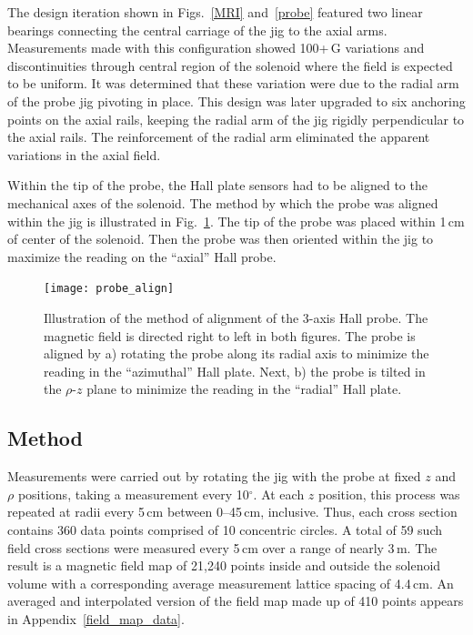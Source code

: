 The design iteration shown in Figs.~\ref{MRI} and~\ref{probe} featured two linear bearings connecting the central carriage of the jig to the axial arms.  Measurements made with this configuration showed 100+\,G variations and discontinuities through central region of the solenoid where the field is expected to be uniform.  It was determined that these variation were due to the radial arm of the probe jig pivoting in place.  This design was later upgraded to six anchoring points on the axial rails, keeping the radial arm of the jig rigidly perpendicular to the axial rails.  The reinforcement of the radial arm eliminated the apparent variations in the axial field.

Within the tip of the probe, the Hall plate sensors had to be aligned to the mechanical axes of the solenoid. The method by which the probe was aligned within the jig is illustrated in Fig.~\ref{probe_align}.  The tip of the probe was placed within 1\,cm of center of the solenoid.  Then the probe was then oriented within the jig to maximize the reading on the ``axial'' Hall probe.

\begin{figure}%
\centering
\texttt{[image: probe\_align]}%
\caption[Illustration of the method of alignment of the 3-axis Hall probe]{Illustration of the method of alignment of the 3-axis Hall probe.  The magnetic field is directed right to left in both figures.  The probe is aligned by a) rotating the probe along its radial axis to minimize the reading in the ``azimuthal'' Hall plate.  Next, b) the probe is tilted in the $\rho$-$z$ plane to minimize the reading in the ``radial'' Hall plate.}%
\label{probe_align}%
\end{figure}

\subsection{Method}
Measurements were carried out by rotating the jig with the probe at fixed $z$ and $\rho$ positions, taking a measurement every 10$^\circ$.  At each $z$ position, this process was repeated at radii every 5\,cm between 0--45\,cm, inclusive.  Thus, each cross section contains 360 data points comprised of 10 concentric circles.  A total of 59 such field cross sections were measured every 5\,cm over a range of nearly 3\,m.  The result is a magnetic field map of 21,240 points inside and outside the solenoid volume with a corresponding average measurement lattice spacing of 4.4\,cm.  An averaged and interpolated version of the field map made up of 410 points appears in Appendix~\ref{field_map_data}.
 
